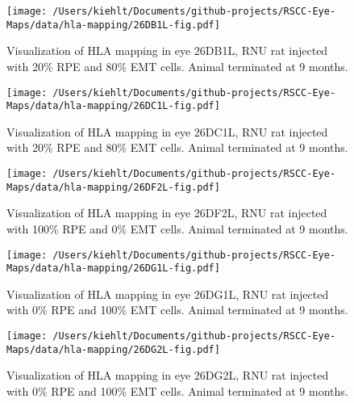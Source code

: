 \documentclass{article}
\begin{document}
\begin{center}
\begin{figure}
\texttt{[image: /Users/kiehlt/Documents/github-projects/RSCC-Eye-Maps/data/hla-mapping/26DB1L-fig.pdf]}
\caption{Visualization of HLA mapping in eye 26DB1L, RNU rat  injected with 20\% RPE and 80\% EMT cells. Animal terminated at 9 months.}
\label{fig:26DB1L}
\end{figure}

\end{center}
\begin{center}
\begin{figure}
\texttt{[image: /Users/kiehlt/Documents/github-projects/RSCC-Eye-Maps/data/hla-mapping/26DC1L-fig.pdf]}
\caption{Visualization of HLA mapping in eye 26DC1L, RNU rat injected with 20\% RPE and 80\% EMT cells. Animal terminated at 9 months.}
\label{fig:26DC1L}
\end{figure}

\end{center}
\begin{center}
\begin{figure}
\texttt{[image: /Users/kiehlt/Documents/github-projects/RSCC-Eye-Maps/data/hla-mapping/26DF2L-fig.pdf]}
\caption{Visualization of HLA mapping in eye 26DF2L, RNU rat injected with 100\% RPE and 0\% EMT cells. Animal terminated at 9 months.}
\label{fig:26DF2L}
\end{figure}

\end{center}
\begin{center}
\begin{figure}
\texttt{[image: /Users/kiehlt/Documents/github-projects/RSCC-Eye-Maps/data/hla-mapping/26DG1L-fig.pdf]}
\caption{Visualization of HLA mapping in eye 26DG1L, RNU rat injected with 0\% RPE and 100\% EMT cells. Animal terminated at 9 months.}
\label{fig:26DG1L}
\end{figure}

\end{center}
\begin{center}
\begin{figure}
\texttt{[image: /Users/kiehlt/Documents/github-projects/RSCC-Eye-Maps/data/hla-mapping/26DG2L-fig.pdf]}
\caption{Visualization of HLA mapping in eye 26DG2L, RNU rat injected with 0\% RPE and 100\% EMT cells. Animal terminated at 9 months.}
\label{fig:26DG2L}
\end{figure}

\end{center}
\end{document}
